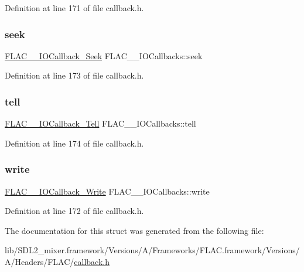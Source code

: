 Definition at line 171 of file callback.\+h.

\mbox{\label{struct_f_l_a_c_____i_o_callbacks_aa1a6f4623965a2d9fcc09b92fabaa1ee}} 
\subsubsection{\texorpdfstring{seek}{seek}}
{\footnotesize\ttfamily \mbox{\hyperlink{group__flac__callbacks_gab3942bbbd6ae09bcefe7cb3a0060c49c}{F\+L\+A\+C\+\_\+\+\_\+\+I\+O\+Callback\+\_\+\+Seek}} F\+L\+A\+C\+\_\+\+\_\+\+I\+O\+Callbacks\+::seek}



Definition at line 173 of file callback.\+h.

\mbox{\label{struct_f_l_a_c_____i_o_callbacks_a8ff0d175a7b3e9318270e305918df827}} 
\subsubsection{\texorpdfstring{tell}{tell}}
{\footnotesize\ttfamily \mbox{\hyperlink{group__flac__callbacks_ga45314930cabc2e9c04867eae6bca309f}{F\+L\+A\+C\+\_\+\+\_\+\+I\+O\+Callback\+\_\+\+Tell}} F\+L\+A\+C\+\_\+\+\_\+\+I\+O\+Callbacks\+::tell}



Definition at line 174 of file callback.\+h.

\mbox{\label{struct_f_l_a_c_____i_o_callbacks_ad64901e5a5710ee4c3c157c75d51ddc0}} 
\subsubsection{\texorpdfstring{write}{write}}
{\footnotesize\ttfamily \mbox{\hyperlink{group__flac__callbacks_gad991792235879aecae289b56a112e1b8}{F\+L\+A\+C\+\_\+\+\_\+\+I\+O\+Callback\+\_\+\+Write}} F\+L\+A\+C\+\_\+\+\_\+\+I\+O\+Callbacks\+::write}



Definition at line 172 of file callback.\+h.



The documentation for this struct was generated from the following file\+:\begin{DoxyCompactItemize}
\item 
lib/\+S\+D\+L2\+\_\+mixer.\+framework/\+Versions/\+A/\+Frameworks/\+F\+L\+A\+C.\+framework/\+Versions/\+A/\+Headers/\+F\+L\+A\+C/\mbox{\hyperlink{callback_8h}{callback.\+h}}\end{DoxyCompactItemize}
